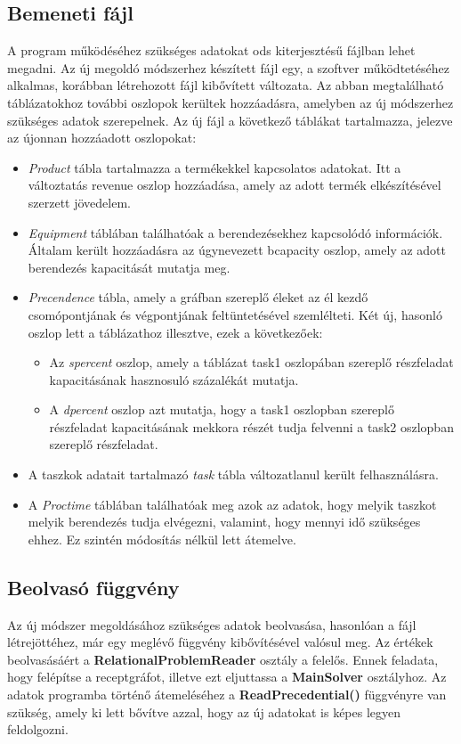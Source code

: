 \subsection{Bemeneti fájl}
A program működéséhez szükséges adatokat ods kiterjesztésű fájlban lehet megadni.
Az új megoldó módszerhez készített fájl egy, a szoftver működtetéséhez alkalmas, korábban létrehozott fájl kibővített változata.
Az abban megtalálható táblázatokhoz további oszlopok kerültek hozzáadásra, amelyben az új módszerhez szükséges adatok szerepelnek.
Az új fájl a következő táblákat tartalmazza, jelezve az újonnan hozzáadott oszlopokat:
\begin{itemize}
  \item \textit{Product} tábla tartalmazza a termékekkel kapcsolatos adatokat.
  Itt a változtatás revenue oszlop hozzáadása, amely az adott termék elkészítésével szerzett jövedelem.
  \item \textit{Equipment} táblában találhatóak a berendezésekhez kapcsolódó információk.
  Általam került hozzáadásra az úgynevezett b\textunderscore capacity oszlop, amely az adott berendezés kapacitását mutatja meg.
  \item \textit{Precendence} tábla, amely a gráfban szereplő éleket az él kezdő csomópontjának és végpontjának feltüntetésével szemlélteti.
  Két új, hasonló oszlop lett a táblázathoz illesztve, ezek a következőek:
  	\begin{itemize}
  		\item Az \textit{s\textunderscore percent} oszlop, amely a táblázat task1 oszlopában szereplő részfeladat kapacitásának hasznosuló százalékát mutatja.
  		\item A \textit{d\textunderscore percent} oszlop  azt mutatja, hogy a task1 oszlopban szereplő részfeladat kapacitásának mekkora részét tudja felvenni a task2 oszlopban szereplő részfeladat.
  	\end{itemize}
  	\item A taszkok adatait tartalmazó \textit{task} tábla változatlanul került felhasználásra.
  	\item A \textit{Proctime} táblában találhatóak meg azok az adatok, hogy melyik taszkot melyik berendezés tudja elvégezni, valamint, hogy mennyi idő szükséges ehhez.
  	Ez szintén módosítás nélkül lett átemelve.
\end{itemize}

\subsection{Beolvasó függvény}
Az új módszer megoldásához szükséges adatok beolvasása, hasonlóan a fájl létrejöttéhez, már egy meglévő függvény kibővítésével valósul meg.
Az értékek beolvasásáért a \textbf{RelationalProblemReader} osztály a felelős.
Ennek feladata, hogy felépítse a receptgráfot, illetve ezt eljuttassa a \textbf{MainSolver} osztályhoz.
Az adatok programba történő átemeléséhez a \textbf{ReadPrecedential()} függvényre van szükség, amely ki lett bővítve azzal, hogy az új adatokat is képes legyen feldolgozni. 

